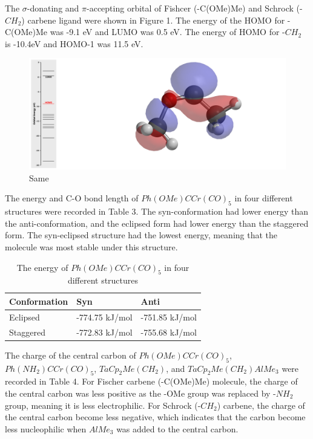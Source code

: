 \documentclass[twocolumn]{article} %
\begin{document}
The $\sigma$-donating and $\pi$-accepting orbital of Fishcer (-C(OMe)Me) and Schrock (-$CH_2$) carbene ligand were shown in Figure 1. The energy of the HOMO for -C(OMe)Me was -9.1 eV and LUMO was 0.5 eV. The energy of HOMO for -$CH_2$ is -10.4eV and HOMO-1 was 11.5 eV. 

\begin{figure}[h!]
\centering
\includegraphics[width=0.95\columnwidth]{C(OMe)Me HOMO white background.png} %
\vspace{2mm} %
\caption{Same}
\end{figure}


The energy and C-O bond length of $Ph(OMe)CCr(CO)_5$ in four different structures were recorded in Table 3. The syn-conformation had lower energy than the anti-conformation, and the eclipsed form had lower energy than the staggered form. The syn-eclipsed structure had the lowest energy, meaning that the molecule was most stable under this structure. 

\begin{table}[h]
\caption{The energy of  $Ph(OMe)CCr(CO)_5$ in four different structures}
\begin{tabular}{L{1.0in}C{1.0in}C{1.0in}}\toprule
Conformation & Syn     & Anti    \\ \hline
Eclipsed     & -774.75 kJ/mol & -751.85 kJ/mol\\
Staggered    & -772.83 kJ/mol & -755.68 kJ/mol \\\bottomrule
\end{tabular}
\end{table}

The charge of the central carbon of $Ph(OMe)CCr(CO)_5$, $Ph(NH_2)CCr(CO)_5$, $TaCp_2Me(CH_2)$, and $TaCp_2Me(CH_2)AlMe_3$ were recorded in Table 4. For Fischer carbene (-C(OMe)Me) molecule, the charge of the central carbon was less positive as the -OMe group was replaced by -$NH_2$ group, meaning it is less electrophilic. For Schrock (-$CH_2$) carbene, the charge of the central carbon become less negative, which indicates that the carbon become less nucleophilic when $AlMe_3$ was added to the central carbon. 
\end{document}
